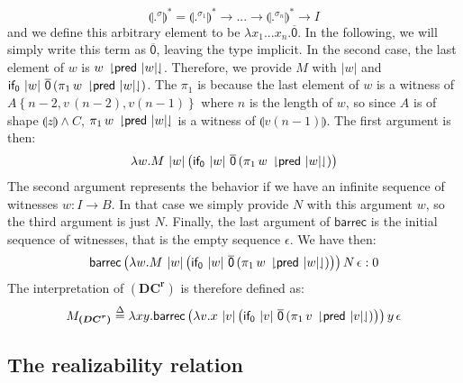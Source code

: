 \documentclass{CSML}
\renewcommand{\ldots}{...}
\newcommand*\Def{\mathrel{\overset{\Delta}{=}}}
\newcommand*\SortA{\sigma}
\newcommand*\LogSortedTerm[2]{#1^{#2}}
\newcommand*\LogVarC{z}
\newcommand*\LogVarE{v}
\newcommand*\LogAnd{\mathbin{\wedge}}
\newcommand*\LogRel[1]{\llparenthesis#1\rrparenthesis}
\newcommand*\LogFormA{A}
\newcommand*\LogFormB{B}
\newcommand*\LogFormC{C}
\newcommand*\LogSubst[1]{\left\{#1\right\}}
\newcommand*\LmSortBot0
\newcommand*\LmSortTo\to
\newcommand*\LmTerm[2]{#1\mathrel{:}#2}
\newcommand*\LmTermA{M}
\newcommand*\LmTermB{N}
\newcommand*\LmVarA{x}
\newcommand*\LmVarB{y}
\newcommand*\LmVarE{v}
\newcommand*\LmVarF{w}
\newcommand*\LmConst[1]{\mathsf{#1}}
\newcommand*\LmProj{\pi}
\newcommand*\LmInterpForm[1]{{#1}^*}
\newcommand*\LmInterpAxiom[1]{M_{#1}}
\newcommand*\CAAxName[1]{{\bm{\scriptstyle(#1)}}}
\newcommand*\CADCName{\CAAxName{DC^r}}
\newcommand*\CADCTerm{\lambda\LmVarA\LmVarB.\CALmbarrec\left(\lambda\LmVarE.\LmVarA\,\CALmlen{\LmVarE}\left(\CALmifz\,\CALmlen{\LmVarE}\,\CALmn{0}\left(\LmProj_1\,\CALmind{\LmVarE}{\CALmpred\,\CALmlen{\LmVarE}}\right)\right)\right)\LmVarB\,\CALmnil}
\newcommand*\CALmn[1]{\LmConst{\overline{#1}}}
\newcommand*\CALmnSort{I}
\newcommand*\CALmbarrec{\LmConst{barrec}}
\newcommand*\CALmifz{\LmConst{if_0}}
\newcommand*\CALmpred{\LmConst{pred}}
\newcommand*\CALmnil{\epsilon}
\newcommand*\CALmlen[1]{\left|#1\right|}
\newcommand*\CALmind[2]{#1\,\downharpoonright\mkern-5mu#2\mkern-5mu\downharpoonleft}
\begin{document}
$$\LmInterpForm{\LogRel{\LogSortedTerm{.}{\SortA}}}=\LmInterpForm{\LogRel{\LogSortedTerm{.}{\SortA_1}}}\LmSortTo\ldots\LmSortTo\LmInterpForm{\LogRel{\LogSortedTerm{.}{\SortA_n}}}\LmSortTo\CALmnSort$$
and we define this arbitrary element to be $\lambda\LmVarA_1\ldots\LmVarA_n.\CALmn{0}$. In the following, we will simply write this term as $\CALmn{0}$, leaving the type implicit. In the second case, the last element of $\LmVarF$ is $\CALmind{\LmVarF}{\CALmpred\,\CALmlen{\LmVarF}}$. Therefore, we provide $\LmTermA$ with $\CALmlen{\LmVarF}$ and $\CALmifz\,\CALmlen{\LmVarF}\,\CALmn{0}\left(\LmProj_1\,\CALmind{\LmVarF}{\CALmpred\,\CALmlen{\LmVarF}}\right)$. The $\LmProj_1$ is because the last element of $\LmVarF$ is a witness of $\LogFormA\LogSubst{n-2,\LogVarE\,\left(n-2\right),\LogVarE\left(n-1\right)}$ where $n$ is the length of $\LmVarF$, so since $\LogFormA$ is of shape $\LogRel{\LogVarC}\LogAnd\LogFormC$, $\LmProj_1\,\CALmind{\LmVarF}{\CALmpred\,\CALmlen{\LmVarF}}$ is a witness of $\LogRel{\LogVarE\left(n-1\right)}$. The first argument is then:
$$\lambda\LmVarF.\LmTermA\,\CALmlen{\LmVarF}\left(\CALmifz\,\CALmlen{\LmVarF}\,\CALmn{0}\left(\LmProj_1\,\CALmind{\LmVarF}{\CALmpred\,\CALmlen{\LmVarF}}\right)\right)$$
The second argument represents the behavior if we have an infinite sequence of witnesses $\LmTerm{\LmVarF}{\CALmnSort\LmSortTo\LogFormB}$. In that case we simply provide $\LmTermB$ with this argument $\LmVarF$, so the third argument is just $\LmTermB$. Finally, the last argument of $\CALmbarrec$ is the initial sequence of witnesses, that is the empty sequence $\CALmnil$. We have then:
$$\LmTerm{\CALmbarrec\left(\lambda\LmVarF.\LmTermA\,\CALmlen{\LmVarF}\left(\CALmifz\,\CALmlen{\LmVarF}\,\CALmn{0}\left(\LmProj_1\,\CALmind{\LmVarF}{\CALmpred\,\CALmlen{\LmVarF}}\right)\right)\right)\LmTermB\,\CALmnil}{\LmSortBot}$$
The interpretation of $\CADCName$ is therefore defined as:
$$\LmInterpAxiom{\CADCName}\Def\CADCTerm$$
\subsection{The realizability relation}
\end{document}
